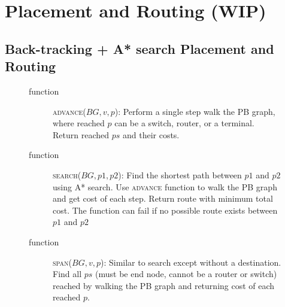 \section{Placement and Routing (WIP)} \label{sec:mapping}
\subsection{Back-tracking + A* search Placement and Routing}
\begin{figure}[!ht]
  \small
  \begin{description}
    \item [function] \textsc{advance}($BG,v,p$):
      Perform a single step walk the PB graph, where reached $p$ can be a switch, router, or a terminal.
      Return reached $ps$ and their costs.
    \item [function] \textsc{search}($BG,p1,p2$):
      Find the shortest path between $p1$ and $p2$ using A* search. Use \textsc{advance} function to walk
      the PB graph and get cost of each step. Return route with minimum total cost. The function can
      fail if no possible route exists between $p1$ and $p2$
    \item [function] \textsc{span}($BG,v,p$):
      Similar to search except without a destination. Find all $ps$ (must be end node, cannot be a router or switch) reached by 
      walking the PB graph and returning cost of each reached $p$.
  \end{description}


\end{figure}
